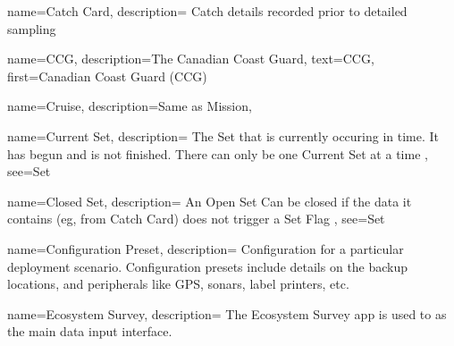  {
    name=Catch Card,
    description={
        Catch details recorded prior to detailed sampling}
}

 {
    name=CCG,
    description={The Canadian Coast Guard},
    text={CCG},
    first={Canadian Coast Guard (CCG)}
}

 {
    name=Cruise,
    description={Same as \gls{Mission}},
}

 {
    name=Current Set,
    description={
        The \gls{Set} that is currently occuring in time.
        It has begun and is not finished.
        There can only be one \gls{Current Set} at a time
    },
    see={Set}
}

 {
    name=Closed Set,
    description={
        An \gls{Open Set} Can be closed if the data it contains (eg, from \gls{Catch Card}) does not trigger a \gls{Set Flag}
    },
    see={Set}
}

 {
    name=Configuration Preset,
    description={
        Configuration for a particular deployment scenario. Configuration presets include details on the backup locations, and peripherals like GPS, sonars, label printers, etc.
    }
}








 {
    name=Ecosystem Survey,
    description={
        The Ecosystem Survey app is used to as the main data input interface.
    }
}

